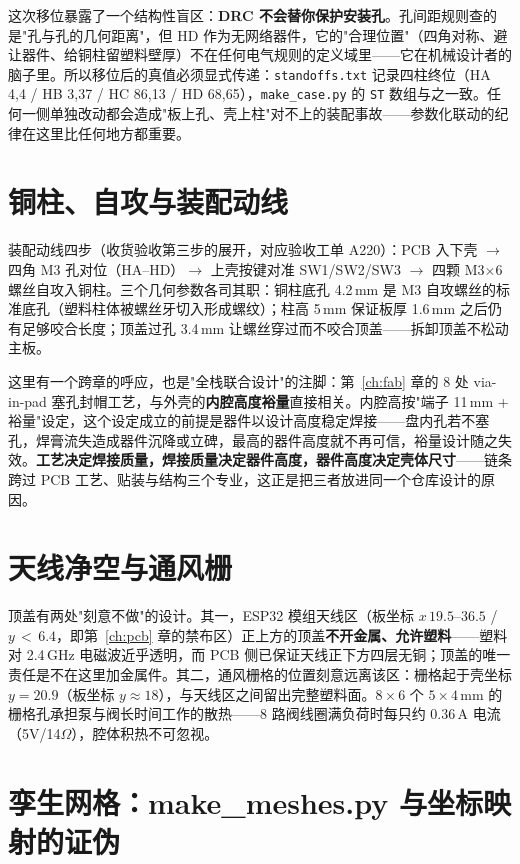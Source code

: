 这次移位暴露了一个结构性盲区：\textbf{DRC 不会替你保护安装孔}。孔间距规则查的是"孔与孔的几何距离"，但 HD 作为无网络器件，它的"合理位置"（四角对称、避让器件、给铜柱留塑料壁厚）不在任何电气规则的定义域里——它在机械设计者的脑子里。所以移位后的真值必须显式传递：\texttt{standoffs.txt} 记录四柱终位（HA 4,4 / HB 3,37 / HC 86,13 / HD 68,65），\texttt{make\_case.py} 的 \texttt{ST} 数组与之一致。任何一侧单独改动都会造成"板上孔、壳上柱"对不上的装配事故——参数化联动的纪律在这里比任何地方都重要。

\section{铜柱、自攻与装配动线}
\label{sec:encl-assembly}

装配动线四步（收货验收第三步的展开，对应验收工单 A220）：PCB 入下壳 $\to$ 四角 M3 孔对位（HA--HD）$\to$ 上壳按键对准 SW1/SW2/SW3 $\to$ 四颗 M3$\times$6 螺丝自攻入铜柱。三个几何参数各司其职：铜柱底孔 4.2\,mm 是 M3 自攻螺丝的标准底孔（塑料柱体被螺丝牙切入形成螺纹）；柱高 5\,mm 保证板厚 1.6\,mm 之后仍有足够咬合长度；顶盖过孔 3.4\,mm 让螺丝穿过而不咬合顶盖——拆卸顶盖不松动主板。

这里有一个跨章的呼应，也是"全栈联合设计"的注脚：第~\ref{ch:fab} 章的 8 处 via-in-pad 塞孔封帽工艺，与外壳的\textbf{内腔高度裕量}直接相关。内腔高按"端子 11\,mm + 裕量"设定，这个设定成立的前提是器件以设计高度稳定焊接——盘内孔若不塞孔，焊膏流失造成器件沉降或立碑，最高的器件高度就不再可信，裕量设计随之失效。\textbf{工艺决定焊接质量，焊接质量决定器件高度，器件高度决定壳体尺寸}——链条跨过 PCB 工艺、贴装与结构三个专业，这正是把三者放进同一个仓库设计的原因。

\section{天线净空与通风栅}
\label{sec:encl-antenna}

顶盖有两处"刻意不做"的设计。其一，ESP32 模组天线区（板坐标 $x\,19.5$--$36.5$ / $y\,<\,6.4$，即第~\ref{ch:pcb} 章的禁布区）正上方的顶盖\textbf{不开金属、允许塑料}——塑料对 2.4\,GHz 电磁波近乎透明，而 PCB 侧已保证天线正下方四层无铜；顶盖的唯一责任是不在这里加金属件。其二，通风栅格的位置刻意远离该区：栅格起于壳坐标 $y=20.9$（板坐标 $y\approx18$），与天线区之间留出完整塑料面。$8\times6$ 个 $5\times4$\,mm 的栅格孔承担泵与阀长时间工作的散热——8 路阀线圈满负荷时每只约 0.36\,A 电流（5V/14$\Omega$），腔体积热不可忽视。

\section{孪生网格：make\_meshes.py 与坐标映射的证伪}
\label{sec:encl-meshes}

